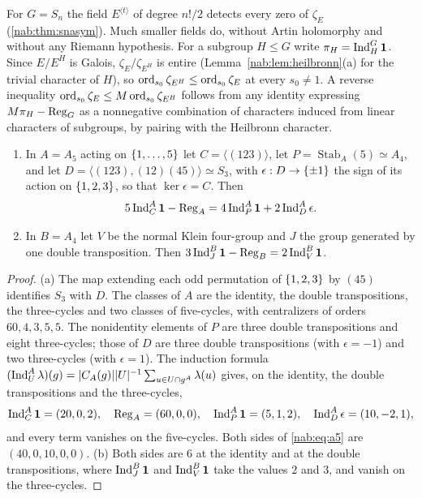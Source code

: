For $G=S_n$ the field $E^{\langle t\rangle}$ of degree $n!/2$ detects every zero of $\zeta_E$
(\cref{nab:thm:snasym}). Much smaller fields do, without Artin holomorphy and without any
Riemann hypothesis. For a subgroup $H\le G$ write $\pi_H=\operatorname{Ind}_H^G\mathbf{1}$. Since $E/E^H$ is
Galois, $\zeta_E/\zeta_{E^H}$ is entire (Lemma~\ref{nab:lem:heilbronn}(a) for the trivial
character of $H$), so $\operatorname{ord}_{s_0}\zeta_{E^H}\le\operatorname{ord}_{s_0}\zeta_E$ at every $s_0\ne1$. A reverse
inequality $\operatorname{ord}_{s_0}\zeta_E\le M\operatorname{ord}_{s_0}\zeta_{E^H}$ follows from any identity expressing
$M\pi_H-\operatorname{Reg}_G$ as a nonnegative combination of characters induced from linear characters
of subgroups, by pairing with the Heilbronn character.

\begin{lemma}\label{nab:lem:a5}
\begin{enumerate}[label=\textup{(\alph*)}]
\item In $A=A_5$ acting on $\{1,\dots,5\}$ let $C=\langle(123)\rangle$, let
$P=\operatorname{Stab}_A(5)\simeq A_4$, and let $D=\langle(123),(12)(45)\rangle\simeq S_3$, with
$\epsilon:D\to\{\pm1\}$ the sign of its action on $\{1,2,3\}$, so that $\ker\epsilon=C$. Then
\begin{equation}\label{nab:eq:a5}
 5\operatorname{Ind}_C^A\mathbf{1}-\operatorname{Reg}_A=4\operatorname{Ind}_P^A\mathbf{1}+2\operatorname{Ind}_D^A\epsilon .
\end{equation}
\item In $B=A_4$ let $V$ be the normal Klein four-group and $J$ the group generated by one
double transposition. Then $3\operatorname{Ind}_J^B\mathbf{1}-\operatorname{Reg}_B=2\operatorname{Ind}_V^B\mathbf{1}$.
\end{enumerate}
\end{lemma}
\begin{proof}
(a) The map extending each odd permutation of $\{1,2,3\}$ by $(45)$ identifies $S_3$ with
$D$. The classes of $A$ are the identity, the double transpositions, the three-cycles and
two classes of five-cycles, with centralizers of orders $60,4,3,5,5$. The nonidentity
elements of $P$ are three double transpositions and eight three-cycles; those of $D$ are
three double transpositions (with $\epsilon=-1$) and two three-cycles (with $\epsilon=1$). The
induction formula $(\operatorname{Ind}_U^A\lambda)(g)=\lvert C_A(g)\rvert\lvert U\rvert^{-1}\sum_{u\in U\cap g^A}\lambda(u)$
gives, on the identity, the double transpositions and the three-cycles,
\[
 \operatorname{Ind}_C^A\mathbf{1}=(20,0,2),\quad\operatorname{Reg}_A=(60,0,0),\quad\operatorname{Ind}_P^A\mathbf{1}=(5,1,2),\quad
 \operatorname{Ind}_D^A\epsilon=(10,-2,1),
\]
and every term vanishes on the five-cycles. Both sides of \eqref{nab:eq:a5} are
$(40,0,10,0,0)$. (b) Both sides are $6$ at the identity and at the double transpositions,
where $\operatorname{Ind}_J^B\mathbf{1}$ and $\operatorname{Ind}_V^B\mathbf{1}$ take the values $2$ and $3$, and vanish on the
three-cycles.
\end{proof}

